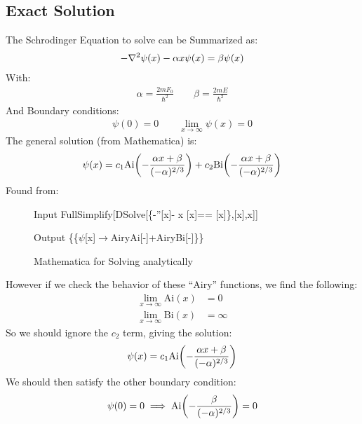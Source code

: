 \documentclass[12pt]{article}
\begin{document}
\subsection{Exact Solution}
The Schrodinger Equation to solve can be Summarized as:
\begin{align*}
  -\laplacian{\psi(x)}-\alpha x\psi(x)=\beta \psi(x)
\end{align*}
With:
\begin{align*}
  \alpha=\frac{2mF_0}{\hbar^2}\qquad \beta=\frac{2mE}{\hbar^2}
\end{align*}
And Boundary conditions:
\begin{align*}
  \psi(0)=0\qquad\lim_{x\to\infty}\psi(x)=0
\end{align*}
The general solution (from Mathematica) is:
\begin{align*}
  \psi(x)=c_1\mathrm{Ai}\qty(-\frac{\alpha x+\beta}{(-\alpha)^{2/3}})
  +c_2\mathrm{Bi}\qty(-\frac{\alpha x+\beta}{(-\alpha)^{2/3}})
\end{align*}
Found from:
\begin{figure}[H]
  \centering
  \begin{mmaCell}[addtoindex=39]{Input}
  FullSimplify[DSolve[\{-\mmaUnd{\(\pmb{\psi}\)}''[x]- \mmaUnd{\(\pmb{\alpha}\)}x \mmaUnd{\(\pmb{\psi}\)}[x]== \mmaUnd{\(\pmb{\beta}\)} \mmaUnd{\(\pmb{\psi}\)}[x]\},\mmaUnd{\(\pmb{\psi}\)}[x],x]]
  \end{mmaCell}
  \begin{mmaCell}{Output}
  \{\{\(\psi\)[x]\(\to\)AiryAi[-]+AiryBi[-]\}\}
\end{mmaCell}
  \caption{Mathematica for Solving analytically}
\end{figure}
However if we check the behavior of these ``Airy'' functions, we find the following:
\begin{align*}
  \lim_{x\to\infty}\mathrm{Ai}(x)&=0\\
  \lim_{x\to\infty}\mathrm{Bi}(x)&=\infty
\end{align*}
So we should ignore the $c_2$ term, giving the solution:
\begin{align*}
  \psi(x)=c_1\mathrm{Ai}\qty(-\frac{\alpha x+\beta}{(-\alpha)^{2/3}})
\end{align*}
We should then satisfy the other boundary condition:
\begin{align*}
  \psi(0)=0\implies\mathrm{Ai}\qty(-\frac{\beta}{(-\alpha)^{2/3}})=0
\end{align*}
\end{document}
